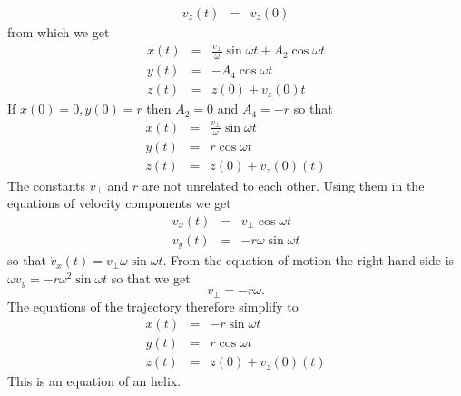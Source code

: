 \begin{enumerate}
\begin{eqnarray*}
v_z(t) &=& v_z(0)
\end{eqnarray*}
from which we get
\begin{eqnarray*}
x(t) &=& \frac{v_\perp}{\omega}\sin\omega t + A_2\cos\omega t \\
y(t) &=& -A_4\cos\omega t \\
z(t) &=& z(0) + v_z(0)t
\end{eqnarray*}
If $x(0) = 0, y(0) = r$ then $A_2 = 0$ and $A_4 = -r$ so that
\begin{eqnarray}
x(t) &=& \frac{v_\perp}{\omega}\sin\omega t \label{c3e51} \\
y(t) &=& r\cos\omega t \label{c3e52} \\
z(t) &=& z(0) + v_z(0)(t) \label{c3e53}
\end{eqnarray}
The constants $v_\perp$ and $r$ are not unrelated to each other. Using them in
the equations of velocity components we get
\begin{eqnarray*}
v_x(t) &=& v_\perp\cos\omega t \\
v_y(t) &=& -r\omega\sin\omega t
\end{eqnarray*}
so that $\dot{v}_x(t) = v_\perp\omega\sin\omega t$. From the equation of motion
the right hand side is $\omega v_y = -r\omega^2\sin\omega t$ so that we get
\begin{equation}\label{c3e54}
v_\perp = -r\omega.
\end{equation}
The equations of the trajectory therefore simplify to
\begin{eqnarray}
x(t) &=& -r\sin\omega t \label{c3e55} \\
y(t) &=& r\cos\omega t \label{c3e56} \\
z(t) &=& z(0) + v_z(0)(t) \label{c3e57}
\end{eqnarray}
This is an equation of an helix.


\end{enumerate}

